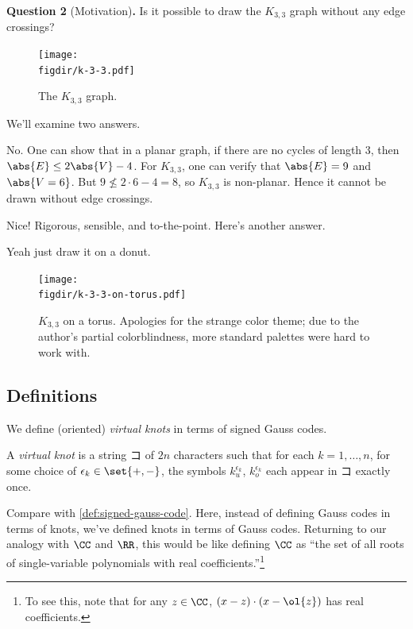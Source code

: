 \noindent \textbf{Question 2}
(Motivation)\textbf{.}\hypertarget{question-2}{} Is it possible to
draw the $K_{3,3}$ graph without any edge crossings?
\begin{figure}[H]
  \centering
  \texttt{[image: \\figdir/k-3-3.pdf]}
  \caption{The $K_{3,3}$ graph.}
  \label{fig:k-3-3}
\end{figure}
We'll examine two answers.
\begin{leftbar}
  \begin{sproof}[Answer 1]
    No. One can show that in a planar graph, if there are no cycles of
    length 3, then $\abs{E} \leq 2\abs{V} - 4$. For $K_{3,3}$, one can
    verify that $\abs{E} = 9$ and $\abs{V = 6}$. But $9 \not\leq
    2\cdot 6 - 4 = 8$, so $K_{3,3}$ is non-planar. Hence it cannot be
    drawn without edge crossings.
  \end{sproof}
\end{leftbar}
Nice! Rigorous, sensible, and to-the-point. Here's another answer.
\begin{leftbar}
  \begin{sproof}[Answer 2]
    Yeah just draw it on a donut.
    \begin{figure}[H]
      \centering
      \texttt{[image: \\figdir/k-3-3-on-torus.pdf]}
      \caption{$K_{3,3}$ on a torus. Apologies for the strange color
        theme; due to the author's partial colorblindness, more
        standard palettes were hard to work with.} \qedhere
    \end{figure}
  \end{sproof}
\end{leftbar}


\subsection{Definitions}
We define (oriented) \emph{virtual knots} in terms of signed Gauss
codes.
\begin{definition}
  A \emph{virtual knot} is a string $コ$ of $2n$ characters such
  that for each $k = 1, \ldots, n$, for some choice of $\epsilon_k \in
  \set{+, -}$, the symbols $k^{\epsilon_k}_u$, $k^{\epsilon_k}_o$
  each appear in $コ$ exactly once.
\end{definition}
Compare with \cref{def:signed-gauss-code}. Here, instead of defining
Gauss codes in terms of knots, we've defined knots in terms of Gauss
codes. Returning to our analogy with $\CC$ and $\RR$, this would be
like defining $\CC$ as ``the set of all roots of single-variable
polynomials with real coefficients.''\footnote{To see this, note that
  for any $z \in \CC$, $(x - z) \cdot (x - \ol{z})$ has real
  coefficients.}

